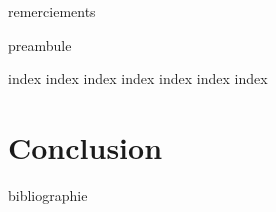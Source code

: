 


\frontmatter


\beautifultableofcontents

\printglossary

{remerciements}

{preambule}

\mainmatter

{index}
{index}
{index}
{index}
{index}
{index}
{index}

\chapter{Conclusion}


\backmatter

{bibliographie}


\newcommand\listfigurenameappendixes{\listfigurename}
\newcommand\listtablenameappendixes{\listtablename}

